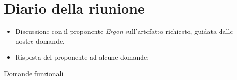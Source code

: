 \section{Diario della riunione}

\begin{itemize}
    \item Discussione con il proponente \emph{Ergon} sull'artefatto richiesto, guidata dalle nostre domande.
    \item Risposta del proponente ad alcune domande:
\end{itemize}
\vspace{1cm}
\begingroup
\renewcommand{\ni}{\noindent}

{\Large Domande funzionali}

\vspace{0.5cm}

